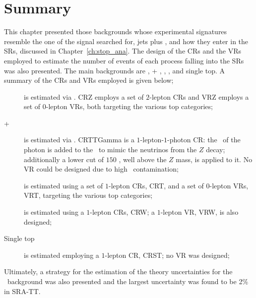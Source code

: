 	\section{Summary}

		This chapter presented those backgrounds whose experimental signatures resemble the one of the signal searched for, jets plus \met, and how they enter in the \acp{SR}, discussed in Chapter~\ref{ch:stop_ana}. The design of the \acp{CR} and the \acp{VR} employed to estimate the number of events of each process falling into the \acp{SR} was also presented. The main backgrounds are \Znunujets, \ttbar + \Znunu, \ttbar, \Wjets, and single top. A summary of the \acp{CR} and \acp{VR} employed is given below;

		\begin{description}
			\item [\boldmath \Zjets] is estimated via \Zll. CRZ employs a set of $2$-lepton \acp{CR} and VRZ employs a set of $0$-lepton \acp{VR}, both targeting the various top categories; 
			\item [\boldmath \ttbar + \Znunu] is estimated via \ttgamma. CRTTGamma is a $1$-lepton-$1$-photon \ac{CR}: the \pt\ of the photon is added to the \met\ to mimic the neutrinos from the $Z$ decay; additionally a lower cut of $150$ \GeV, well above the $Z$ mass, is applied to it. No \ac{VR} could be designed due to high \gammajets\ contamination;
			\item [\boldmath \ttbar] is estimated using a set of $1$-lepton \acp{CR}, CRT, and a set of $0$-lepton \acp{VR}, VRT, targeting the various top categories;
			\item [\boldmath \Wjets] is estimated using a $1$-lepton \acp{CR}, CRW; a $1$-lepton \ac{VR}, VRW, is also designed;
			\item [Single top] is estimated employing a $1$-lepton CR, CRST; no \ac{VR} was designed;
		\end{description}

		Ultimately, a strategy for the estimation of the theory uncertainties for the \ttZ\ background was also presented and the largest uncertainty was found to be 2\% in SRA-TT.
